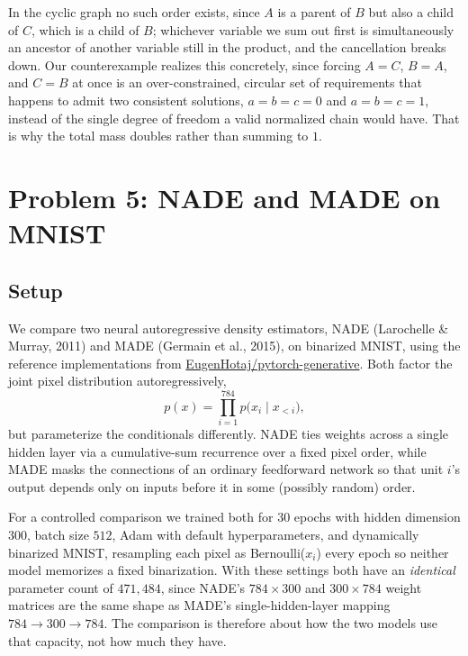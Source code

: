 \documentclass[11pt]{article}
\begin{document}
In the cyclic graph no such order exists, since $A$ is a parent of $B$ but also
a child of $C$, which is a child of $B$; whichever variable we sum out first is
simultaneously an ancestor of another variable still in the product, and the
cancellation breaks down. Our counterexample realizes this concretely, since
forcing $A=C$, $B=A$, and $C=B$ at once is an over-constrained, circular set of
requirements that happens to admit two consistent solutions, $a=b=c=0$ and
$a=b=c=1$, instead of the single degree of freedom a valid normalized chain
would have. That is why the total mass doubles rather than summing to $1$.

\newpage
\section{Problem 5: NADE and MADE on MNIST}

\subsection*{Setup}

We compare two neural autoregressive density estimators, NADE (Larochelle \&
Murray, 2011) and MADE (Germain et al., 2015), on binarized MNIST, using the
reference implementations from
\href{https://github.com/EugenHotaj/pytorch-generative}{EugenHotaj/pytorch-generative}.
Both factor the joint pixel distribution autoregressively,
\[
  p(x) = \prod_{i=1}^{784} p\big(x_i \mid x_{<i}\big),
\]
but parameterize the conditionals differently. NADE ties weights across a
single hidden layer via a cumulative-sum recurrence over a fixed pixel order,
while MADE masks the connections of an ordinary feedforward network so that
unit $i$'s output depends only on inputs before it in some (possibly random)
order.

For a controlled comparison we trained both for $30$ epochs with hidden
dimension $300$, batch size $512$, Adam with default hyperparameters, and
dynamically binarized MNIST, resampling each pixel as Bernoulli($x_i$) every
epoch so neither model memorizes a fixed binarization. With these settings both
have an \emph{identical} parameter count of $471{,}484$, since NADE's
$784 \times 300$ and $300\times784$ weight matrices are the same shape as MADE's
single-hidden-layer mapping $784 \to 300 \to 784$. The comparison is therefore
about how the two models use that capacity, not how much they have.
\end{document}
